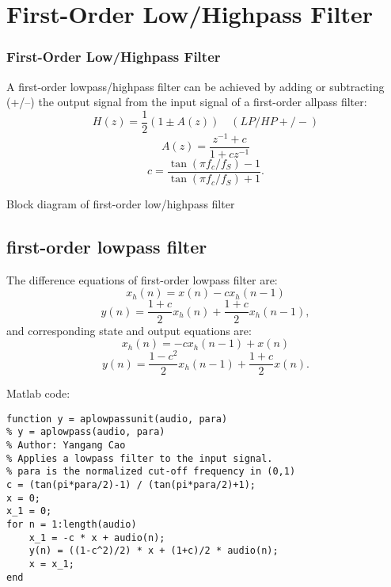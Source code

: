 \documentclass[10pt,a4paper,oneside]{beamer}
\newcommand{\product}{$\displaystyle \times$}
\begin{document}
\section{First-Order Low/Highpass Filter}



\begin{frame}
\frametitle{First-Order Low/Highpass Filter}
A first-order lowpass/highpass filter can be achieved by adding or subtracting (+/--) the output signal from the input signal of a first-order allpass filter:
\[
H(z) = \frac{1}{2}(1 \pm A(z))\quad(LP/HP+/-)
\]
\[
A(z) = \frac{z^{-1} + c}{1 + cz^{-1}}
\]
\[
c = \frac{\tan(\pi f_c/f_S) - 1}{\tan(\pi f_c/f_S) + 1}.
\]
\end{frame}

\begin{frame}
Block diagram of first-order low/highpass filter 
\begin{center}
\end{center}
\end{frame}
\subsection{first-order lowpass filter}
\begin{frame}
The difference equations of first-order lowpass filter are:
\[
x_h(n) = x(n) - cx_h(n-1)
\]
\[
y(n) = \frac{1+c}{2}x_h(n) + \frac{1+c}{2}x_h(n-1),
\]
and corresponding state and output equations are:
\[
x_h(n) = -cx_h(n-1) +x(n)
\]
\[
y(n) = \frac{1-c^2}{2}x_h(n-1) + \frac{1+c}{2}x(n).
\]
\end{frame}
\begin{frame}[fragile]
Matlab code:
\begin{lstlisting}
function y = aplowpassunit(audio, para)
% y = aplowpass(audio, para)
% Author: Yangang Cao
% Applies a lowpass filter to the input signal.
% para is the normalized cut-off frequency in (0,1)
c = (tan(pi*para/2)-1) / (tan(pi*para/2)+1);
x = 0;
x_1 = 0;
for n = 1:length(audio)
    x_1 = -c * x + audio(n);
    y(n) = ((1-c^2)/2) * x + (1+c)/2 * audio(n);
    x = x_1;   
end
\end{lstlisting}
\end{frame}
\end{document}
